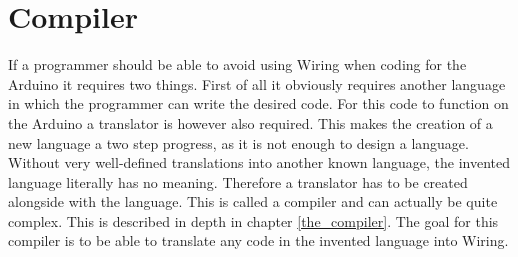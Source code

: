 \section{Compiler}
If a programmer should be able to avoid using Wiring when coding for the Arduino it requires two things. First of all it obviously requires another language in which the programmer can write the desired code. For this code to function on the Arduino a translator is however also required. This makes the creation of a new language a two step progress, as it is not enough to design a language. Without very well-defined translations into another known language, the invented language literally has no meaning. Therefore a translator has to be created alongside with the language. This is called a compiler and can actually be quite complex. This is described in depth in chapter \ref{the_compiler}. The goal for this compiler is to be able to translate any code in the invented language into Wiring.